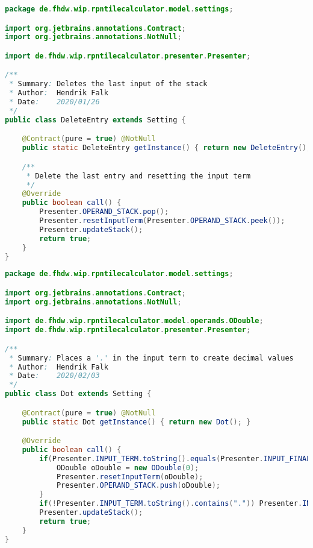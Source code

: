 \begin{lstlisting}[caption=DeleteEntry (Falk),label=list:DeleteEntry,language=Java]
package de.fhdw.wip.rpntilecalculator.model.settings;

import org.jetbrains.annotations.Contract;
import org.jetbrains.annotations.NotNull;

import de.fhdw.wip.rpntilecalculator.presenter.Presenter;

/**
 * Summary: Deletes the last input of the stack
 * Author:  Hendrik Falk
 * Date:    2020/01/26
 */
public class DeleteEntry extends Setting {

    @Contract(pure = true) @NotNull
    public static DeleteEntry getInstance() { return new DeleteEntry(); }

    /**
     * Delete the last entry and resetting the input term
     */
    @Override
    public boolean call() {
        Presenter.OPERAND_STACK.pop();
        Presenter.resetInputTerm(Presenter.OPERAND_STACK.peek());
        Presenter.updateStack();
        return true;
    }
}
\end{lstlisting}    

\begin{lstlisting}[caption=Dot (Falk),label=list:Dot,language=Java]
package de.fhdw.wip.rpntilecalculator.model.settings;

import org.jetbrains.annotations.Contract;
import org.jetbrains.annotations.NotNull;

import de.fhdw.wip.rpntilecalculator.model.operands.ODouble;
import de.fhdw.wip.rpntilecalculator.presenter.Presenter;

/**
 * Summary: Places a '.' in the input term to create decimal values
 * Author:  Hendrik Falk
 * Date:    2020/02/03
 */
public class Dot extends Setting {

    @Contract(pure = true) @NotNull
    public static Dot getInstance() { return new Dot(); }

    @Override
    public boolean call() {
        if(Presenter.INPUT_TERM.toString().equals(Presenter.INPUT_FINALIZED)) {
            ODouble oDouble = new ODouble(0);
            Presenter.resetInputTerm(oDouble);
            Presenter.OPERAND_STACK.push(oDouble);
        }
        if(!Presenter.INPUT_TERM.toString().contains(".")) Presenter.INPUT_TERM.append(".");
        Presenter.updateStack();
        return true;
    }
}
\end{lstlisting}    

